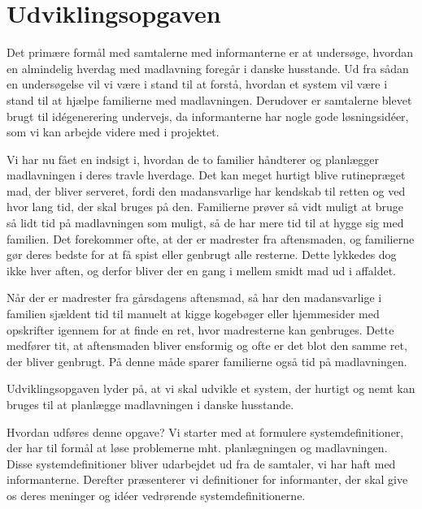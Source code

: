 \section{Udviklingsopgaven}
\label{sec:udviklingsopaven}

Det primære formål med samtalerne med informanterne er at undersøge, hvordan en almindelig hverdag med madlavning foregår i danske husstande. Ud fra sådan en undersøgelse vil vi være i stand til at forstå, hvordan et system vil være i stand til at hjælpe familierne med madlavningen. Derudover er samtalerne blevet brugt til idégenerering undervejs, da informanterne har nogle gode løsningsidéer, som vi kan arbejde videre med i projektet. 

Vi har nu fået en indsigt i, hvordan de to familier håndterer og planlægger madlavningen i deres travle hverdage. Det kan meget hurtigt blive rutinepræget mad, der bliver serveret, fordi den madansvarlige har kendskab til retten og ved hvor lang tid, der skal bruges på den. Familierne prøver så vidt muligt at bruge så lidt tid på madlavningen som muligt, så de har mere tid til at hygge sig med familien. Det forekommer ofte, at der er madrester fra aftensmaden, og familierne gør deres bedste for at få spist eller genbrugt alle resterne. Dette lykkedes dog ikke hver aften, og derfor bliver der en gang i mellem smidt mad ud i affaldet. 

Når der er madrester fra gårsdagens aftensmad, så har den madansvarlige i familien sjældent tid til manuelt at kigge kogebøger eller hjemmesider med opskrifter igennem for at finde en ret, hvor madresterne kan genbruges. Dette medfører tit, at aftensmaden bliver ensformig og ofte er det blot den samme ret, der bliver genbrugt. På denne måde sparer familierne også tid på madlavningen.

Udviklingsopgaven lyder på, at vi skal udvikle et system, der hurtigt og nemt kan bruges til at planlægge madlavningen i danske husstande. 

Hvordan udføres denne opgave? Vi starter med at formulere systemdefinitioner, der har til formål at løse problemerne mht. planlægningen og madlavningen. Disse systemdefinitioner bliver udarbejdet ud fra de samtaler, vi har haft med informanterne. Derefter præsenterer vi definitioner for informanter, der skal give os deres meninger og idéer vedrørende systemdefinitionerne.